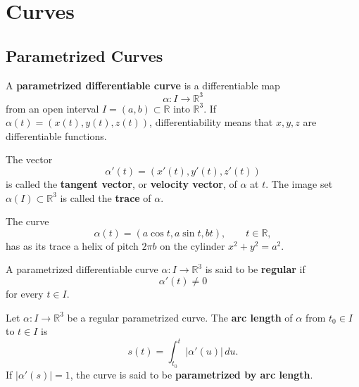 \documentclass[12pt, oneside]{book}
\begin{document}
\frontmatter
{}
\tableofcontents

\mainmatter
{}

\chapter{Curves}


\section{Parametrized Curves}

\begin{definition}
    A \textbf{parametrized differentiable curve} is a differentiable map
    \[
        \alpha:I\rightarrow \mathbb{R}^3
    \]
    from an open interval $I=(a,b)\subset \mathbb{R}$ into $\mathbb{R}^3$.
    If $\alpha(t)=(x(t),y(t),z(t))$, differentiability means that $x,y,z$ are
    differentiable functions.
\end{definition}

\begin{definition}
    The vector
    \[
        \alpha'(t)=(x'(t),y'(t),z'(t))
    \]
    is called the \textbf{tangent vector}, or \textbf{velocity vector}, of
    $\alpha$ at $t$.  The image set $\alpha(I)\subset \mathbb{R}^3$ is called
    the \textbf{trace} of $\alpha$.
\end{definition}

\begin{example}
    The curve
    \[
        \alpha(t)=(a\cos t,a\sin t,bt), \qquad t\in \mathbb{R},
    \]
    has as its trace a helix of pitch $2\pi b$ on the cylinder
    $x^2+y^2=a^2$.
\end{example}


\begin{definition}
    A parametrized differentiable curve
    $\alpha:I\rightarrow \mathbb{R}^3$ is said to be \textbf{regular} if
    \[
        \alpha'(t)\neq 0
    \]
    for every $t\in I$.
\end{definition}

\begin{definition}
    Let $\alpha:I\rightarrow \mathbb{R}^3$ be a regular parametrized curve.
    The \textbf{arc length} of $\alpha$ from $t_0\in I$ to $t\in I$ is
    \[
        s(t)=\int_{t_0}^{t}|\alpha'(u)|\,du .
    \]
    If $|\alpha'(s)|=1$, the curve is said to be \textbf{parametrized by arc
        length}.
\end{definition}
\end{document}
